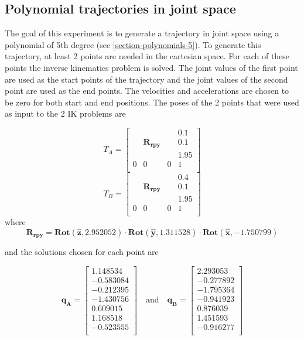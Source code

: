 \subsection{Polynomial trajectories in joint space}
\label{section:9-2-polynomial-traj}

The goal of this experiment is to generate a trajectory in joint space using a polynomial of 5th degree (see \ref{section-polynomials-5}). To generate this trajectory, at least 2 points are needed in the cartesian 
space. For each of these points the inverse kinematics problem is solved. The joint values of the first point are used as the start points of the trajectory and the joint values of the second point are used as the end points.
The velocities and accelerations are chosen to be zero for both start and end positions. The poses of the 2 points that were used as input to the 2 IK problems are

\[
T_A = 
\begin{bmatrix}
  &            &   & 0.1 \\
  & \mathbf{R_{rpy}} &   & 0.1 \\
  &            &   & 1.95 \\
0 &     0      & 0 & 1 \\
\end{bmatrix}
\]
\[
T_B = 
\begin{bmatrix}
  &            &   & 0.4 \\
  & \mathbf{R_{rpy}} &   & 0.1 \\
  &            &   & 1.95 \\
0 &     0      & 0 & 1 \\
\end{bmatrix}
\]
where 
\[
\mathbf{R_{rpy}} = \mathbf{Rot}(\mathbf{\hat{z}}, 2.952052) \cdot \mathbf{Rot}(\mathbf{\hat{y}}, 1.311528) \cdot \mathbf{Rot}(\mathbf{\hat{x}}, -1.750799)
\]

and the solutions chosen for each point are

\[
\mathbf{q_A} =
\begin{bmatrix}
1.148534 \\
-0.583084 \\ 
-0.212395 \\ 
-1.430756 \\
0.609015 \\ 
1.168518 \\ 
-0.523555 \\
\end{bmatrix}
\quad \textrm{and} \quad
\mathbf{q_B} = 
\begin{bmatrix}
2.293053 \\ 
-0.277892 \\
-1.795364 \\ 
-0.941923 \\ 
0.876039 \\
1.451593 \\
-0.916277 \\
\end{bmatrix}
\]

